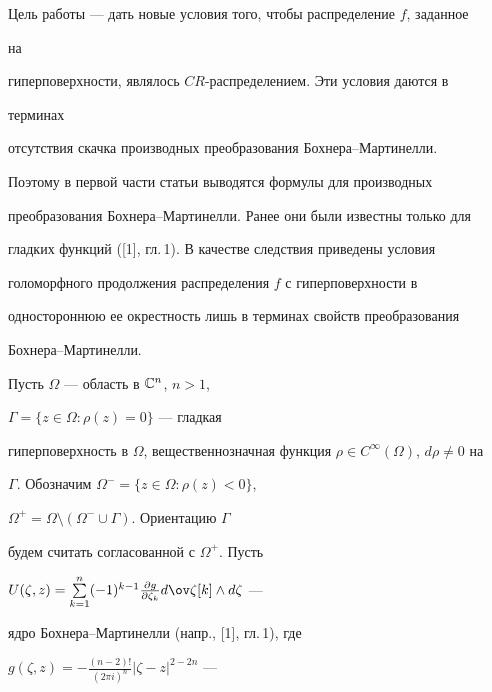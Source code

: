 

\maketitle 


\label{begin} 


 


 


Цель работы --- дать новые условия того, чтобы распределение $f$, заданное 


на 


гиперповерхности, являлось $CR$-распределением. Эти условия даются в 


терминах 


отсутствия скачка производных преобразования Бохнера--Мартинелли. 


Поэтому в первой части статьи выводятся формулы для производных 


преобразования Бохнера--Мартинелли. Ранее они были известны только для 


гладких функций ([1], гл.\,1). В качестве следствия приведены условия 


голоморфного продолжения распределения $f$ с гиперповерхности в 


одностороннюю ее окрестность лишь в терминах свойств преобразования 


Бохнера--Мартинелли. 


 


Пусть $\Omega$ --- область в $\Bbb C^n$, $n>1$, 


$\Gamma=\{z\in\Omega:\rho(z)=0\}$ --- гладкая 


гиперповерхность в $\Omega$, вещественнозначная функция $\rho\in 


C^\infty(\Omega)$, $d\rho\ne0$ на 


$\Gamma$. Обозначим $\Omega^-=\{z\in\Omega:\rho(z)<0\}$, 


$\Omega^+=\Omega\setminus(\Omega^-\cup\Gamma)$. Ориентацию $\Gamma$ 


будем считать согласованной с $\Omega^+$. Пусть 


$U(\zeta,z)=\sum\limits^n_{k=1}(-1)^{k-1} 


\frac{\partial g}{\partial \zeta_k}d\ov\zeta[k]\wedge d\zeta$ --- 


ядро Бохнера--Мартинелли (напр., [1], гл.\,1), где 


$g(\zeta,z)=-\frac{(n-2)!}{(2\pi i)^n}|\zeta-z|^{2-2n}$ --- 


